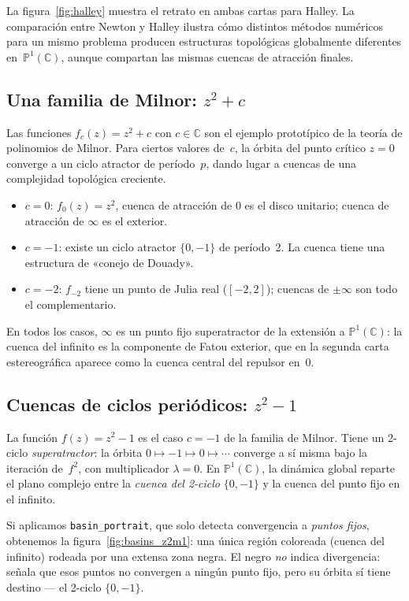 \documentclass[11pt,a4paper]{article}
\theoremstyle{plain}
\theoremstyle{definition}
\theoremstyle{remark}
\newcommand{\C}{\mathbb{C}}
\newcommand{\Puno}{\mathbb{P}^1(\mathbb{C})}
\newcommand{\fn}[1]{\texttt{#1}}
\begin{document}
La figura~\ref{fig:halley} muestra el retrato en ambas cartas para Halley.
La comparación entre Newton y Halley ilustra cómo distintos métodos
numéricos para un mismo problema producen estructuras topológicas
globalmente diferentes en~$\Puno$, aunque compartan las mismas
cuencas de atracción finales.

\subsection{Una familia de Milnor: \texorpdfstring{$z^2+c$}{z2+c}}

Las funciones $f_c(z)=z^2+c$ con $c\in\C$ son el ejemplo prototípico
de la teoría de polinomios de Milnor.
Para ciertos valores de~$c$, la órbita del punto crítico $z=0$ converge
a un ciclo atractor de período~$p$, dando lugar a cuencas de una
complejidad topológica creciente.

\begin{itemize}
  \item $c=0$: $f_0(z)=z^2$, cuenca de atracción de $0$ es el disco
        unitario; cuenca de atracción de $\infty$ es el exterior.
  \item $c=-1$: existe un ciclo atractor $\{0,-1\}$ de período~2.
        La cuenca tiene una estructura de «conejo de Douady».
  \item $c=-2$: $f_{-2}$ tiene un punto de Julia real ($[-2,2]$);
        cuencas de $\pm\infty$ son todo el complementario.
\end{itemize}

En todos los casos, $\infty$ es un punto fijo superatractor de la
extensión a $\Puno$: la cuenca del infinito es la componente de Fatou
exterior, que en la segunda carta estereográfica aparece como la cuenca
central del repulsor en~$0$.

\subsection{Cuencas de ciclos periódicos: \texorpdfstring{$z^2-1$}{z2-1}}
\label{ssec:pcycle_z2}

La función $f(z)=z^2-1$ es el caso $c=-1$ de la familia de Milnor.
Tiene un 2-ciclo \emph{superatractor}: la órbita $0\mapsto -1\mapsto 0\mapsto\cdots$
converge a sí misma bajo la iteración de~$f^2$, con multiplicador $\lambda=0$.
En $\Puno$, la dinámica global reparte el plano complejo entre la
\emph{cuenca del 2-ciclo} $\{0,-1\}$ y la cuenca del punto fijo en el infinito.

Si aplicamos \fn{basin\_portrait}, que solo detecta convergencia a \emph{puntos fijos},
obtenemos la figura~\ref{fig:basins_z2m1}: una única región coloreada (cuenca del
infinito) rodeada por una extensa zona negra.
El negro \emph{no} indica divergencia: señala que esos puntos no convergen a ningún
punto fijo, pero su órbita sí tiene destino --- el 2-ciclo $\{0,-1\}$.
\end{document}
